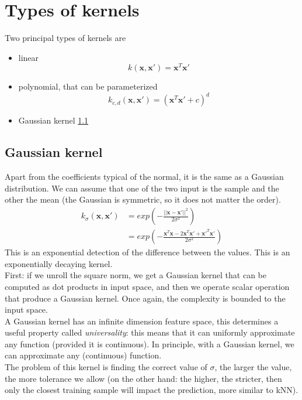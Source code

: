 \section{Types of kernels}
Two principal types of kernels are
\begin{itemize}
	\item linear
		\[
			k(\pmb{x}, \pmb{x}') = \pmb{x}^{T}\pmb{x}'
		\]

	\item polynomial, that can be parameterized
		\[
			k_{c, d}(\pmb{x}, \pmb{x}') = (\pmb{x}^{T}\pmb{x}' + c)^{d}
		\]

	\item Gaussian kernel \ref{cha:gaussian_kernel}
\end{itemize}

\subsection{Gaussian kernel}
\label{cha:gaussian_kernel} Apart from the coefficients typical of the normal, it
is the same as a Gaussian distribution. We can assume that one of the two input
is the sample and the other the mean (the Gaussian is symmetric, so it does not
matter the order).
\begin{align*}
	k_{\sigma}(\pmb{x}, \pmb{x}') & = exp{\left(- \frac{||\pmb{x}- \pmb{x}'||^{2}}{2 \sigma^{2}} \right) }                                        \\
	                              & = exp{\left( - \frac{\pmb{x}^{T}\pmb{x}- 2 \pmb{x}^{T}\pmb{x}' + \pmb{x}'^{T}\pmb{x}' }{2\sigma^{2}} \right)}
\end{align*}
This is an exponential detection of the difference between the values. This is an
exponentially decaying kernel.\\

First: if we unroll the square norm, we get a Gaussian kernel that can be
computed as dot products in input space, and then we operate scalar operation that
produce a Gaussian kernel. Once again, the complexity is bounded to the input space.\\
A Gaussian kernel has an infinite dimension feature space, this determines a
useful property called \textit{universality}: this means that it can uniformly
approximate any function (provided it is continuous). In principle, with a
Gaussian kernel, we can approximate any (continuous) function.\\

The problem of this kernel is finding the correct value of $\sigma$, the larger the
value, the more tolerance we allow (on the other hand: the higher, the stricter,
then only the closest training sample will impact the prediction, more similar to
kNN).

